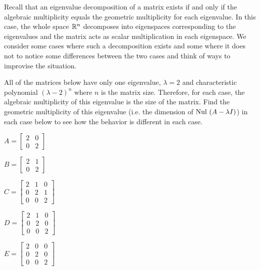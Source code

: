 
Recall that an eigenvalue decomposition of a matrix exists if and only if the algebraic multiplicity equals the geometric multiplicity for each eigenvalue. In this case, the whole space $\mathbb{R}^n$ decomposes into eigenspaces corresponding to the eigenvalues and the matrix acts as scalar multiplication in each eigenspace. We consider some cases where such a decomposition exists and some where it does not to notice some differences between the two cases and think of ways to improvise the situation. 

\begin{pa}\label{pa:JCF}
\be 
\item All of the matrices below have only one eigenvalue, $\lambda = 2$ and characteristic polynomial $(\lambda-2)^n$ where $n$ is the matrix size. Therefore, for each case, the algebraic multiplicity of this eigenvalue is the size of the matrix. Find the geometric multiplicity of this eigenvalue (i.e. the dimension of $\text{Nul }(A-\lambda I)$) in each case below to see how the behavior is different in each case.\\

\ba 
\item $A = \left[ \begin{array}{cc} 2&0  \\ 0&2 \end{array} \right]$

\item $B = \left[ \begin{array}{cc} 2&1  \\ 0&2 \end{array} \right]$

\item $C = \left[ \begin{array}{ccc} 2&1&0 \\ 0&2&1 \\ 0&0&2 \end{array} \right]$

\item $D = \left[ \begin{array}{ccc} 2&1&0 \\ 0&2&0 \\ 0&0&2 \end{array} \right]$

\item $E = \left[ \begin{array}{ccc} 2&0&0 \\ 0&2&0 \\ 0&0&2 \end{array} \right]$


\end{pa}
